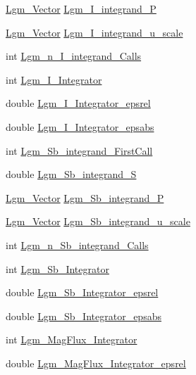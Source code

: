 \begin{CompactItemize}
\item 
\hyperlink{struct_lgm___vector}{Lgm\_\-Vector} \hyperlink{struct_lgm___mag_model_info_a3ad9c4b833001273b79b67cb2a86d49}{Lgm\_\-I\_\-integrand\_\-P}
\item 
\hyperlink{struct_lgm___vector}{Lgm\_\-Vector} \hyperlink{struct_lgm___mag_model_info_e7d44a46b9d0110bafb9f5c47f1b047c}{Lgm\_\-I\_\-integrand\_\-u\_\-scale}
\item 
int \hyperlink{struct_lgm___mag_model_info_0b40445e52e091e26fb821e573c41ba0}{Lgm\_\-n\_\-I\_\-integrand\_\-Calls}
\item 
int \hyperlink{struct_lgm___mag_model_info_22a0997163992fbc3d980522be2fd613}{Lgm\_\-I\_\-Integrator}
\item 
double \hyperlink{struct_lgm___mag_model_info_1be8f828cb392cad59b8c27918f7862f}{Lgm\_\-I\_\-Integrator\_\-epsrel}
\item 
double \hyperlink{struct_lgm___mag_model_info_84d1542c6975c366a6b0387d6497c86b}{Lgm\_\-I\_\-Integrator\_\-epsabs}
\item 
int \hyperlink{struct_lgm___mag_model_info_53c05ef170d36948f85a32ca0f5a6912}{Lgm\_\-Sb\_\-integrand\_\-FirstCall}
\item 
double \hyperlink{struct_lgm___mag_model_info_ba782efaf640472be322e8290acac370}{Lgm\_\-Sb\_\-integrand\_\-S}
\item 
\hyperlink{struct_lgm___vector}{Lgm\_\-Vector} \hyperlink{struct_lgm___mag_model_info_64ea881b31763fe2b1c1fc78d589dd84}{Lgm\_\-Sb\_\-integrand\_\-P}
\item 
\hyperlink{struct_lgm___vector}{Lgm\_\-Vector} \hyperlink{struct_lgm___mag_model_info_fc1c449cd255aa38568f885b3732a699}{Lgm\_\-Sb\_\-integrand\_\-u\_\-scale}
\item 
int \hyperlink{struct_lgm___mag_model_info_e1edd10efda316240fd228a9bab0cc24}{Lgm\_\-n\_\-Sb\_\-integrand\_\-Calls}
\item 
int \hyperlink{struct_lgm___mag_model_info_713978104b56d5edd790199e13ee10fd}{Lgm\_\-Sb\_\-Integrator}
\item 
double \hyperlink{struct_lgm___mag_model_info_f26880c2615c83b542f39feab78bf592}{Lgm\_\-Sb\_\-Integrator\_\-epsrel}
\item 
double \hyperlink{struct_lgm___mag_model_info_128e371c7ac1d69077ca45eb79cc094e}{Lgm\_\-Sb\_\-Integrator\_\-epsabs}
\item 
int \hyperlink{struct_lgm___mag_model_info_0ba66db9846f0a3c1c41abe473719dcb}{Lgm\_\-MagFlux\_\-Integrator}
\item 
double \hyperlink{struct_lgm___mag_model_info_c15192e0cdb8a093d53b3aed95fd5899}{Lgm\_\-MagFlux\_\-Integrator\_\-epsrel}

\end{CompactItemize}
